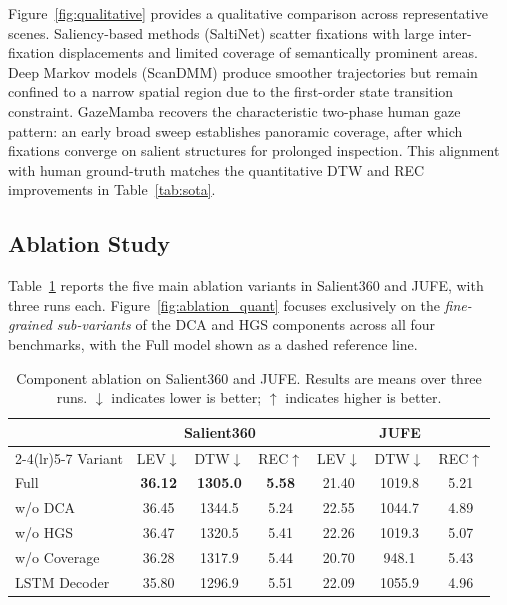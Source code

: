 \documentclass[sigconf]{acmart}
\begin{document}
Figure~\ref{fig:qualitative} provides a qualitative comparison across representative scenes. Saliency-based methods (SaltiNet) scatter fixations with large inter-fixation displacements and limited coverage of semantically prominent areas. Deep Markov models (ScanDMM) produce smoother trajectories but remain confined to a narrow spatial region due to the first-order state transition constraint. GazeMamba recovers the characteristic two-phase human gaze pattern: an early broad sweep establishes panoramic coverage, after which fixations converge on salient structures for prolonged inspection. This alignment with human ground-truth matches the quantitative DTW and REC improvements in Table~\ref{tab:sota}.

\subsection{Ablation Study}
\label{sec:ablation}

Table~\ref{tab:ablation} reports the five main ablation variants in
Salient360 and JUFE, with three runs each.
Figure~\ref{fig:ablation_quant} focuses exclusively on the
\emph{fine-grained sub-variants} of the DCA and HGS components across
all four benchmarks, with the Full model shown as a dashed reference line.
\begin{table}[t]
  \centering
  \small
  \setlength{\tabcolsep}{4pt}
  \caption{Component ablation on Salient360 and JUFE. Results are means over three runs. $\downarrow$ indicates lower is better; $\uparrow$ indicates higher is better.}
  \label{tab:ablation}
  \begin{tabular}{lcccccc}
    \toprule
    & \multicolumn{3}{c}{Salient360} & \multicolumn{3}{c}{JUFE} \\
    \cmidrule(lr){2-4}\cmidrule(lr){5-7}
    Variant
      & LEV$\downarrow$ & DTW$\downarrow$ & REC$\uparrow$
      & LEV$\downarrow$ & DTW$\downarrow$ & REC$\uparrow$ \\
    \midrule
    Full
      & \textbf{36.12} & \textbf{1305.0} & \textbf{5.58}
      & 21.40          & 1019.8          & 5.21 \\
    \midrule
    w/o DCA
      & 36.45 & 1344.5 & 5.24
      & 22.55 & 1044.7 & 4.89 \\
    w/o HGS
      & 36.47 & 1320.5 & 5.41
      & 22.26 & 1019.3 & 5.07 \\
    w/o Coverage
      & 36.28 & 1317.9 & 5.44
      & 20.70 & 948.1  & 5.43 \\
    LSTM Decoder
      & 35.80 & 1296.9 & 5.51
      & 22.09 & 1055.9 & 4.96 \\
    \bottomrule
  \end{tabular}
\end{table}
\end{document}
